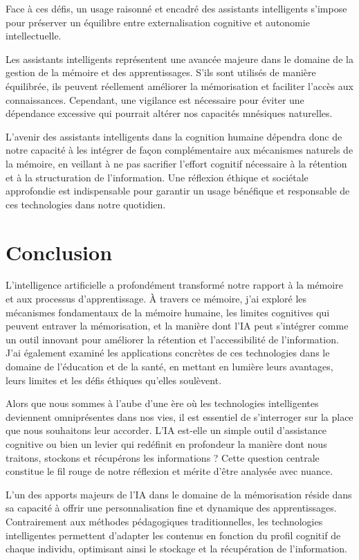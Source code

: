 \documentclass[12pt,a4paper]{report}
\begin{document}
Face à ces défis, un usage raisonné et encadré des assistants intelligents s’impose pour préserver un équilibre entre externalisation cognitive et autonomie intellectuelle.

Les assistants intelligents représentent une avancée majeure dans le domaine de la gestion de la mémoire et des apprentissages. S’ils sont utilisés de manière équilibrée, ils peuvent réellement améliorer la mémorisation et faciliter l’accès aux connaissances. Cependant, une vigilance est nécessaire pour éviter une dépendance excessive qui pourrait altérer nos capacités mnésiques naturelles.

L’avenir des assistants intelligents dans la cognition humaine dépendra donc de notre capacité à les intégrer de façon complémentaire aux mécanismes naturels de la mémoire, en veillant à ne pas sacrifier l’effort cognitif nécessaire à la rétention et à la structuration de l’information. Une réflexion éthique et sociétale approfondie est indispensable pour garantir un usage bénéfique et responsable de ces technologies dans notre quotidien.

\chapter*{Conclusion}

L’intelligence artificielle a profondément transformé notre rapport à la mémoire et aux processus d’apprentissage. À travers ce mémoire, j'ai exploré les mécanismes fondamentaux de la mémoire humaine, les limites cognitives qui peuvent entraver la mémorisation, et la manière dont l’IA peut s’intégrer comme un outil innovant pour améliorer la rétention et l’accessibilité de l’information. J'ai également examiné les applications concrètes de ces technologies dans le domaine de l’éducation et de la santé, en mettant en lumière leurs avantages, leurs limites et les défis éthiques qu’elles soulèvent.

Alors que nous sommes à l’aube d’une ère où les technologies intelligentes deviennent omniprésentes dans nos vies, il est essentiel de s’interroger sur la place que nous souhaitons leur accorder. L’IA est-elle un simple outil d’assistance cognitive ou bien un levier qui redéfinit en profondeur la manière dont nous traitons, stockons et récupérons les informations ? Cette question centrale constitue le fil rouge de notre réflexion et mérite d’être analysée avec nuance.

L’un des apports majeurs de l’IA dans le domaine de la mémorisation réside dans sa capacité à offrir une personnalisation fine et dynamique des apprentissages. Contrairement aux méthodes pédagogiques traditionnelles, les technologies intelligentes permettent d’adapter les contenus en fonction du profil cognitif de chaque individu, optimisant ainsi le stockage et la récupération de l’information.
\end{document}
